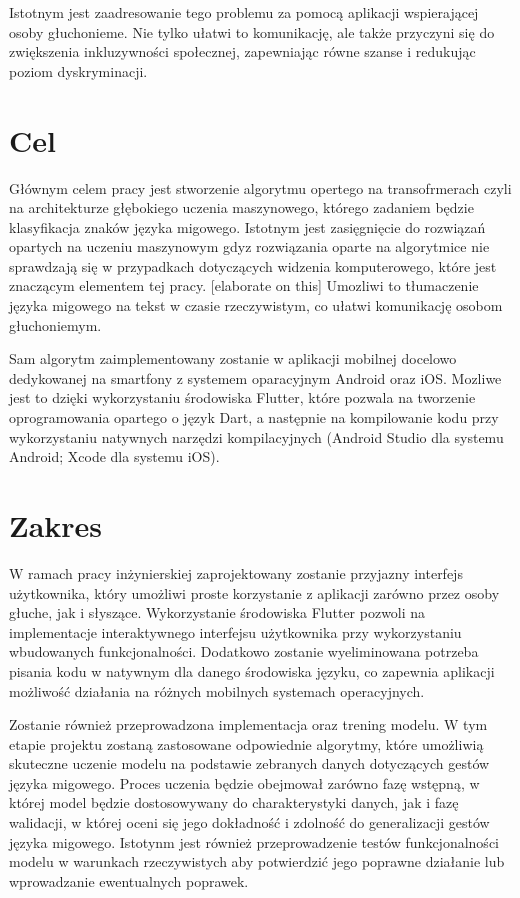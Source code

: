 \documentclass[12pt,a4paper,twoside]{book} %
\begin{document}
Istotnym jest zaadresowanie tego problemu za pomocą aplikacji wspierającej osoby głuchonieme.
Nie tylko ułatwi to komunikację, ale także przyczyni się do zwiększenia inkluzywności społecznej, zapewniając równe szanse i redukując poziom dyskryminacji.


\section{Cel}\label{sec:aim}

Głównym celem pracy jest stworzenie algorytmu opertego na transofrmerach czyli na architekturze głębokiego uczenia maszynowego, którego zadaniem będzie klasyfikacja znaków języka migowego.
Istotnym jest zasięgnięcie do rozwiązań opartych na uczeniu maszynowym gdyz rozwiązania oparte na algorytmice nie sprawdzają się w przypadkach dotyczących widzenia komputerowego, które jest znaczącym elementem tej pracy. [elaborate on this]
Umozliwi to tłumaczenie języka migowego na tekst w czasie rzeczywistym, co ułatwi komunikację osobom głuchoniemym. 

Sam algorytm zaimplementowany zostanie w aplikacji mobilnej docelowo dedykowanej na smartfony z systemem oparacyjnym Android oraz iOS. Mozliwe jest to dzięki wykorzystaniu środowiska Flutter, które pozwala na tworzenie oprogramowania opartego o język Dart, a następnie na kompilowanie kodu przy wykorzystaniu natywnych narzędzi kompilacyjnych (Android Studio dla systemu Android; Xcode dla systemu iOS).

\section{Zakres}\label{sec:scope}

W ramach pracy inżynierskiej zaprojektowany zostanie przyjazny interfejs użytkownika, który umożliwi proste korzystanie z aplikacji zarówno przez osoby głuche, jak i słyszące.
Wykorzystanie środowiska Flutter pozwoli na implementacje interaktywnego interfejsu użytkownika przy wykorzystaniu wbudowanych funkcjonalności.
Dodatkowo zostanie wyeliminowana potrzeba pisania kodu w natywnym dla danego środowiska języku, co zapewnia aplikacji możliwość działania na różnych mobilnych systemach operacyjnych.

Zostanie również przeprowadzona implementacja oraz trening modelu.
W tym etapie projektu zostaną zastosowane odpowiednie algorytmy, które umożliwią skuteczne uczenie modelu na podstawie zebranych danych dotyczących gestów języka migowego.
Proces uczenia będzie obejmował zarówno fazę wstępną, w której model będzie dostosowywany do charakterystyki danych, jak i fazę walidacji, w której oceni się jego dokładność i zdolność do generalizacji gestów języka migowego.
Istotynm jest również przeprowadzenie testów funkcjonalności modelu w warunkach rzeczywistych aby potwierdzić jego poprawne działanie lub wprowadzanie ewentualnych poprawek.  
\end{document}
